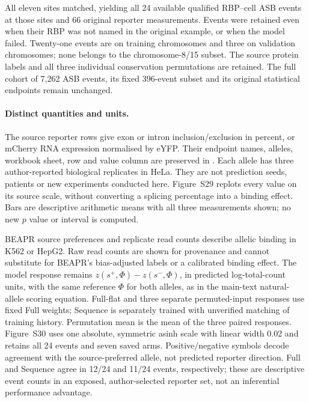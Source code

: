 All eleven sites matched, yielding all 24 available qualified RBP--cell ASB events at those sites and 66 original reporter measurements. Events were retained even when their RBP was not named in the original example, or when the model failed. Twenty-one events are on training chromosomes and three on validation chromosomes; none belongs to the chromosome-8/15 subset. The source protein labels and all three individual conservation permutations are retained. The full cohort of 7,262 ASB events, its fixed 396-event subset and its original statistical endpoints remain unchanged.

\paragraph{Distinct quantities and units.} The source reporter rows give exon or intron inclusion/exclusion in percent, or mCherry RNA expression normalised by eYFP. Their endpoint names, alleles, workbook sheet, row and value column are preserved in . Each allele has three author-reported biological replicates in HeLa. They are not prediction seeds, patients or new experiments conducted here. Figure~S29 replots every value on its source scale, without converting a splicing percentage into a binding effect. Bars are descriptive arithmetic means with all three measurements shown; no new $p$ value or interval is computed.

BEAPR source preferences and replicate read counts describe allelic binding in K562 or HepG2. Raw read counts are shown for provenance and cannot substitute for BEAPR's bias-adjusted labels or a calibrated binding effect. The model response remains $z(s^+,\Phi)-z(s^-,\Phi)$, in predicted log-total-count units, with the same reference $\Phi$ for both alleles, as in the main-text natural-allele scoring equation. Full-flat and three separate permuted-input responses use fixed Full weights; Sequence is separately trained with unverified matching of training history. Permutation mean is the mean of the three paired responses. Figure~S30 uses one absolute, symmetric asinh scale with linear width 0.02 and retains all 24 events and seven saved arms. Positive/negative symbols decode agreement with the source-preferred allele, not predicted reporter direction. Full and Sequence agree in 12/24 and 11/24 events, respectively; these are descriptive event counts in an exposed, author-selected reporter set, not an inferential performance advantage.

